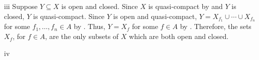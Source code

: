 \begin{partsolution}{iii}
Suppose \(Y \subseteq X\) is open and closed.
Since \(X\) is quasi-compact by  and \(Y\) is closed, \(Y\) is quasi-compact.
Since \(Y\) is open and quasi-compact, \(Y = X_{f_1} \cup \cdots \cup X_{f_n}\) for some \(f_1, \ldots, f_n \in A\) by .
Thus, \(Y = X_f\) for some \(f \in A\) by .
Therefore, the sets \(X_f\), for \(f \in A\), are the only subsets of \(X\) which are both open and closed.
\end{partsolution}

\begin{partsolution}{iv}

\end{partsolution}